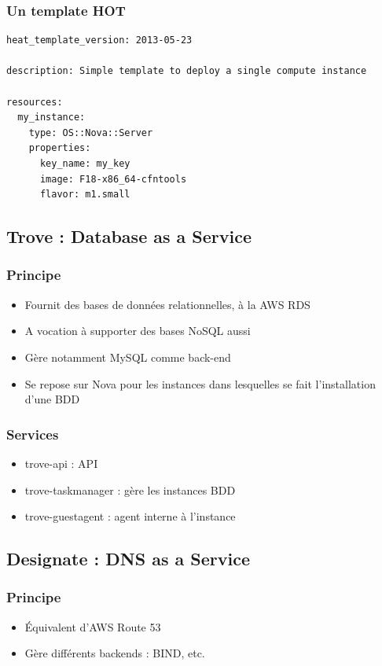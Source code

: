   \begin{frame}[containsverbatim]
    \frametitle{Un template HOT}
\begin{verbatim}
heat_template_version: 2013-05-23

description: Simple template to deploy a single compute instance

resources:
  my_instance:
    type: OS::Nova::Server
    properties:
      key_name: my_key
      image: F18-x86_64-cfntools
      flavor: m1.small
\end{verbatim}
  \end{frame}

  \subsection[Trove]{Trove : Database as a Service}

  \begin{frame}
    \frametitle{Principe}
    \begin{itemize}
      \item Fournit des bases de données relationnelles, à la AWS RDS
      \item A vocation à supporter des bases NoSQL aussi
      \item Gère notamment MySQL comme back-end
      \item Se repose sur Nova pour les instances dans lesquelles se fait l'installation d'une BDD
    \end{itemize}
  \end{frame}

  \begin{frame}
    \frametitle{Services}
    \begin{itemize}
      \item trove-api : API
      \item trove-taskmanager : gère les instances BDD
      \item trove-guestagent : agent interne à l'instance
    \end{itemize}
  \end{frame}

  \subsection[Designate]{Designate : DNS as a Service}

  \begin{frame}
    \frametitle{Principe}
    \begin{itemize}
      \item Équivalent d'AWS Route 53
      \item Gère différents backends : BIND, etc.
    \end{itemize}
  \end{frame}

